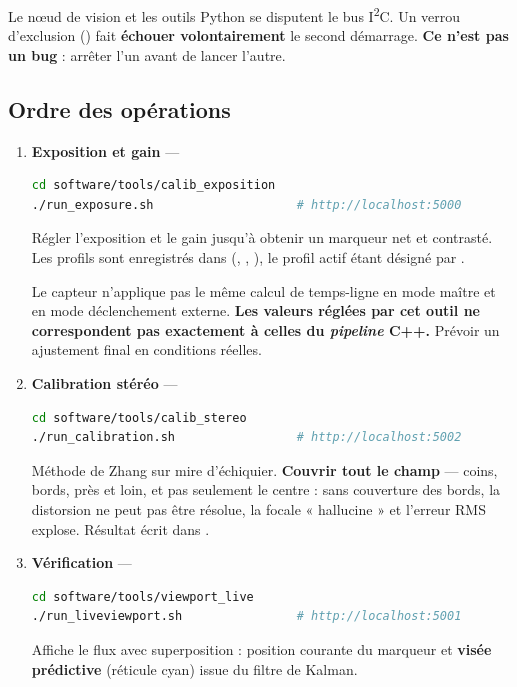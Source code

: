 \documentclass[11pt,a4paper]{article}
\begin{document}
\begin{avertissement}
Le n\oe ud de vision et les outils Python se disputent le bus I\textsuperscript{2}C. Un
verrou d'exclusion () fait \textbf{échouer volontairement}
le second démarrage. \textbf{Ce n'est pas un bug} : arrêter l'un avant de lancer l'autre.
\end{avertissement}

\subsection{Ordre des opérations}

\begin{enumerate}
  \item \textbf{Exposition et gain} — 
        \begin{lstlisting}[language=bash]
cd software/tools/calib_exposition
./run_exposure.sh                    # http://localhost:5000
        \end{lstlisting}
        Régler l'exposition et le gain jusqu'à obtenir un marqueur net et contrasté.
        Les profils sont enregistrés dans
         (, ,
        ), le profil actif étant désigné par
        .

        \begin{note}
        Le capteur n'applique pas le même calcul de temps-ligne en mode maître et en mode
        déclenchement externe. \textbf{Les valeurs réglées par cet outil ne correspondent pas
        exactement à celles du \emph{pipeline} C++.} Prévoir un ajustement final en
        conditions réelles.
        \end{note}

  \item \textbf{Calibration stéréo} — 
        \begin{lstlisting}[language=bash]
cd software/tools/calib_stereo
./run_calibration.sh                 # http://localhost:5002
        \end{lstlisting}
        Méthode de Zhang \cite{zhang2000calibration} sur mire d'échiquier.
        \textbf{Couvrir tout le champ} — coins, bords, près et loin, et pas seulement le
        centre : sans couverture des bords, la distorsion ne peut pas être résolue, la
        focale « hallucine » et l'erreur RMS explose. Résultat écrit dans
        .

  \item \textbf{Vérification} — 
        \begin{lstlisting}[language=bash]
cd software/tools/viewport_live
./run_liveviewport.sh                # http://localhost:5001
        \end{lstlisting}
        Affiche le flux avec superposition : position courante du marqueur et
        \textbf{visée prédictive} (réticule cyan) issue du filtre de Kalman.
\end{enumerate}
\end{document}
